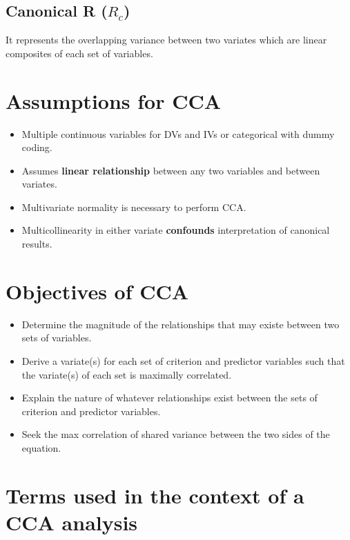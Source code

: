 \documentclass[]{book}
\providecommand{\tightlist}{%
  \setlength{\itemsep}{0pt}\setlength{\parskip}{0pt}}
\begin{document}
\subsection{\texorpdfstring{Canonical R (\textbf{\(R_c\)})
}{Canonical R (R\_c)  }}\label{canonical-r-r_c}

It represents the overlapping variance between two variates which are
linear composites of each set of variables.

\section{Assumptions for CCA}\label{assumptions-for-cca}

\begin{itemize}
\tightlist
\item
  Multiple continuous variables for DVs and IVs or categorical with
  dummy coding.
\item
  Assumes \textbf{linear relationship} between any two variables and
  between variates.
\item
  Multivariate normality is necessary to perform CCA.
\item
  Multicollinearity in either variate \textbf{confounds} interpretation
  of canonical results.
\end{itemize}

\section{Objectives of CCA}\label{objectives-of-cca}

\begin{itemize}
\tightlist
\item
  Determine the magnitude of the relationships that may existe between
  two sets of variables.
\item
  Derive a variate(s) for each set of criterion and predictor variables
  such that the variate(s) of each set is maximally correlated.
\item
  Explain the nature of whatever relationships exist between the sets of
  criterion and predictor variables.
\item
  Seek the max correlation of shared variance between the two sides of
  the equation.
\end{itemize}

\section{Terms used in the context of a CCA
analysis}\label{terms-used-in-the-context-of-a-cca-analysis}
\end{document}
